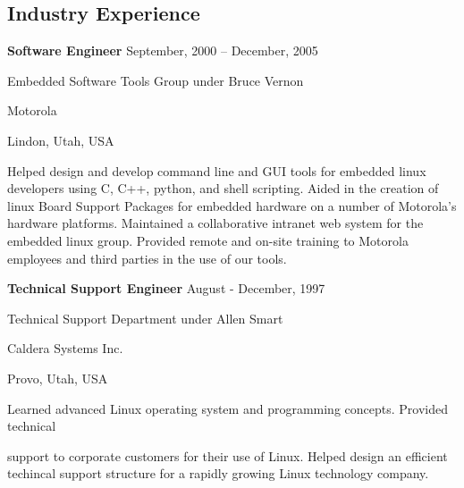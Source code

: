\documentclass[margin,line,article,letterpaper]{res}
\newenvironment{list1}{
  \begin{list}{}{%
      \setlength{\itemsep}{0in}
      \setlength{\parsep}{0in} \setlength{\parskip}{0in}
      \setlength{\topsep}{0in} \setlength{\partopsep}{0in} 
      \setlength{\leftmargin}{0.17in}}}{\end{list}}
\newcommand{\timespan}[1]{#1}
\begin{document}
\begin{resume}
\section{Industry Experience}
\textbf{Software Engineer} \hfill \timespan{September, 2000 -- December, 2005}\\
\vspace{-10pt}
\begin{list1}
\item Embedded Software Tools Group under Bruce Vernon
\item Motorola
\item Lindon, Utah, USA
\vspace{6pt}
\item Helped design and develop command line and GUI tools for embedded linux developers
using C, C++, python, and shell scripting. Aided in the creation of linux Board 
Support Packages for embedded hardware on a number of Motorola's hardware platforms. 
Maintained a collaborative intranet web system for the embedded linux group. 
Provided remote and on-site training to Motorola employees and third parties in the 
use of our tools. 
\end{list1}

\textbf{Technical Support Engineer} \hfill \timespan{August - December, 1997}\\
\vspace{-10pt}
\begin{list1}
\item Technical Support Department under Allen Smart
\item Caldera Systems Inc.
\item Provo, Utah, USA
\vspace{6pt}
\item Learned advanced Linux operating system and programming concepts. Provided technical

support to corporate customers for their use of Linux. Helped design an efficient 
techincal support structure for a rapidly growing Linux technology company.
\end{list1}



\end{resume}
\end{document}
